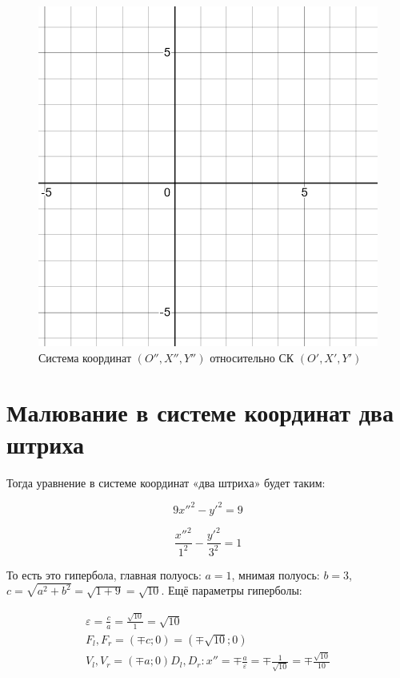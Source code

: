 \documentclass[12pt, a4paper]{article}
\begin{document}
    \begin{figure}[h!]
        \centering
        \includegraphics[width=\textwidth]{resources/1.7_grid_x'.png}
        \caption{Система координат $(O'', X'', Y'')$ относительно СК $(O', X', Y')$}
        \label{fig:grid_2}
    \end{figure}
    \FloatBarrier

    \section{Малювание в системе координат два штриха}

    Тогда уравнение в системе координат «два штриха» будет таким:
    
    \begin{equation}
        9x''^2 - y'^2 = 9
    \end{equation}

    \begin{equation}
        \frac{x''^2}{1^2} - \frac{y'^2}{3^2} = 1
    \end{equation}

    То есть это гипербола, главная полуось: $a = 1$, 
    мнимая полуось: $b = 3$,
    $c = \sqrt{a^2 + b^2} = \sqrt{1 + 9} = \sqrt{10}$.
    Ещё параметры гиперболы:

    \begin{gather}
        \varepsilon = \frac{c}{a} = \frac{\sqrt{10}}{1} = \sqrt{10} \\
        F_l, F_r = (\mp c; 0) = (\mp \sqrt{10}; 0) \\
        V_l, V_r = (\mp a; 0)
        D_l, D_r: x'' = \mp \frac{a}{\varepsilon} = \mp \frac{1}{\sqrt{10}} = \mp \frac{\sqrt{10}}{10}
    \end{gather}
\end{document}
